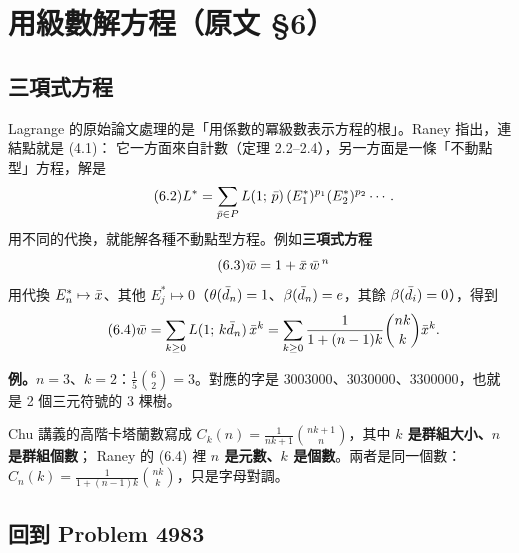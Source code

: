 \section{用級數解方程（原文 §6）}\label{sec:equations}

\subsection{三項式方程}

Lagrange 的原始論文處理的是「用係數的冪級數表示方程的根」。Raney 指出，連結點就是 (4.1)：
它一方面來自計數（定理 2.2--2.4），另一方面是一條「不動點型」方程，解是 
\begin{equation}\tag{6.2}
L^{*}=\sum_{\bar p\in P}L(1;\,\bar p)\,(E_1^*)^{p_1}(E_2^*)^{p_2}\cdots .
\end{equation}
用不同的代換，就能解各種不動點型方程。例如\textbf{三項式方程}
\begin{equation}\tag{6.3}
\bar w=1+\bar x\,\bar w^{\,n}
\end{equation}
用代換 $E_n^*\mapsto\bar x$、其他 $E_j^*\mapsto0$（$\theta(\bar d_n)=1$、$\beta(\bar d_n)=e$，其餘 $\beta(\bar d_i)=0$），得到
\begin{equation}\tag{6.4}
\bar w=\sum_{k\ge0}L(1;\,k\bar d_n)\,\bar x^k=\sum_{k\ge0}\frac{1}{1+(n-1)k}\binom{nk}{k}\bar x^k .
\end{equation}

\begin{table}[H]
\centering
\RanTrinomialTable
\caption{式 (6.4) 的係數 $\frac{1}{1+(n-1)k}\binom{nk}{k}$（Fuss--Catalan 數）。程式另外用「逐次代入解方程」與「定理 2.2」核對。}
\label{tab:trinomial}
\end{table}

\textbf{例。}$n=3$、$k=2$：$\frac15\binom62=3$。對應的字是 $3003000$、$3030000$、$3300000$，也就是 2 個三元符號的 3 棵樹。

\begin{notebox}[字母對調警告]
Chu 講義的高階卡塔蘭數寫成 $C_k(n)=\frac{1}{nk+1}\binom{nk+1}{n}$，其中 \textbf{$k$ 是群組大小、$n$ 是群組個數}；
Raney 的 (6.4) 裡 \textbf{$n$ 是元數、$k$ 是個數}。兩者是同一個數：$C_n(k)=\frac{1}{1+(n-1)k}\binom{nk}{k}$，只是字母對調。
\end{notebox}

\subsection{回到 Problem 4983}

